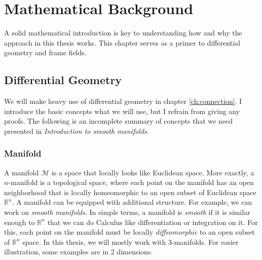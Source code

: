 \documentclass[../thesis.tex]{subfiles}
\begin{document}
\chapter{Mathematical Background}\label{ch:math-background}

A solid mathematical introduction is key to understanding how and why the approach
in this thesis works. This chapter serves as a primer to differential geometry and frame fields.
\section{Differential Geometry}
We will make heavy use of differential geometry in chapter \ref{ch:connection}.
I introduce the basic concepts what we will use, but I refrain from
giving any proofs. The following is an incomplete summary of concepts that we need presented in
\emph{Introduction to smooth manifolds}\cite{LeeManifold}.

\subsection{Manifold} A manifold $\mathcal{M}$ is a space that locally looks like Euclidean space.
More exactly, a $n$-manifold is a topological space, where each point on the manifold has an open neighborhood
that is locally homeomorphic to an open subset of Euclidean space $\mathbb{R}^n$.
A manifold can be equipped with additional structure. For example, we can work on \emph{smooth manifolds}.
In simple terms, a manifold is \emph{smooth} if it is similar enough to $\mathbb{R}^n$ that we can do Calculus
like differentiation or integration on it. For this, each point on the manifold must be
locally \emph{diffeomorphic} to an open subset of $\mathbb{R}^n$ space.
In this thesis, we will mostly work with 3-manifolds. For easier illustration, some examples are in 2 dimensions.
\end{document}
